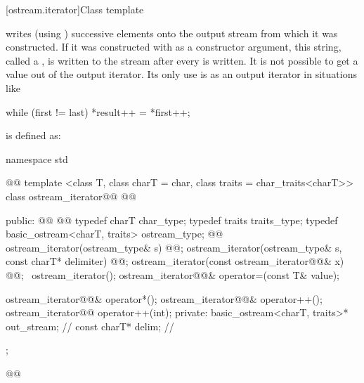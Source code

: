 %
\begin{itemdescr}
\pnum
\returns
{}
\end{itemdescr}

[ostream.iterator]{Class template }

\pnum
{}%
writes (using
)
successive elements onto the output stream from which it was constructed.
If it was constructed with
as a constructor argument, this string, called a
,
is written to the stream after every
is written.
It is not possible to get a value out of the output iterator.
Its only use is as an output iterator in situations like

\begin{codeblock}
while (first != last)
  *result++ = *first++;
\end{codeblock}

\pnum
{}
is defined as:

\begin{codeblock}
namespace std { @@
  template <class T, class charT = char, class traits = char_traits<charT>>
  class ostream_iterator@\removed{:}@
    @@ {
  public:
    @@
    @@
    typedef charT char_type;
    typedef traits traits_type;
    typedef basic_ostream<charT, traits> ostream_type;
    @@
    ostream_iterator(ostream_type& s) @@;
    ostream_iterator(ostream_type& s, const charT* delimiter) @@;
    ostream_iterator(const ostream_iterator@@& x) @@;
   ~ostream_iterator();
    ostream_iterator@@& operator=(const T& value);

    ostream_iterator@@& operator*();
    ostream_iterator@@& operator++();
    ostream_iterator@@ operator++(int);
  private:
    basic_ostream<charT, traits>* out_stream;  // \expos
    const charT* delim;                        // \expos
  };
}@\added{\}\}}\newtxt{\}}@
\end{codeblock}


